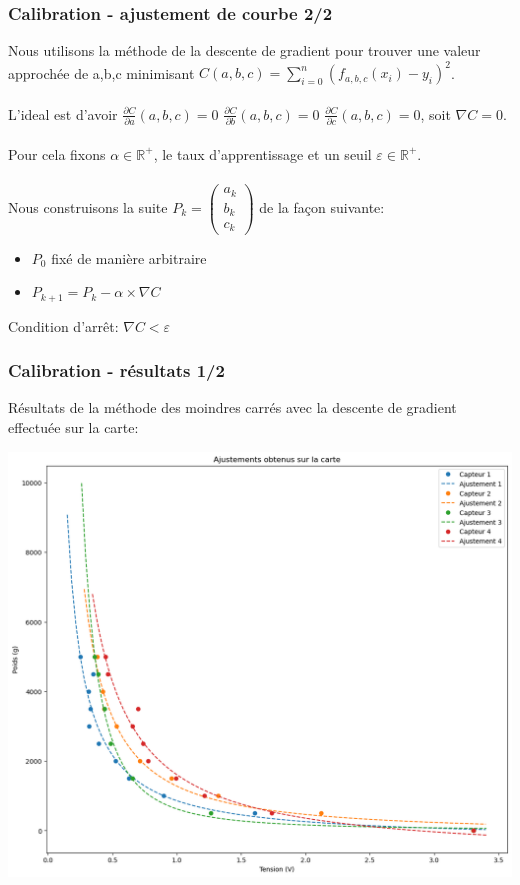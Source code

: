\begin{frame}
    \frametitle{Calibration - ajustement de courbe 2/2}
    Nous utilisons la méthode de la descente de gradient pour trouver une valeur approchée de a,b,c minimisant $C(a,b,c)=\sum_{i=0}^{n} (f_{a,b,c}(x_i)-y_i)^2$.
    \\
    \\
    L'ideal est d'avoir $\frac{\partial C}{\partial a} (a,b,c) = 0$ $\frac{\partial C}{\partial b} (a,b,c) = 0$ $\frac{\partial C}{\partial c} (a,b,c) = 0$, soit $\nabla C = 0$.
    \\
    \\
    Pour cela fixons $\alpha \in \mathbb{R}^+$, le taux d'apprentissage et un seuil $\varepsilon \in \mathbb{R}^+$.
    \\
    \\
    Nous construisons la suite $P_k=\begin{pmatrix} a_k \\ b_k \\ c_k \end{pmatrix}$ de la façon suivante:
    \begin{itemize}
        \item $P_0$ fixé de manière arbitraire
        \item $P_{k+1}= P_{k} - \alpha \times \nabla C$
    \end{itemize}
    Condition d'arrêt: $\nabla C < \varepsilon$
\end{frame}

\begin{frame}
    \frametitle{Calibration - résultats 1/2}
    Résultats de la méthode des moindres carrés avec la descente de gradient effectuée sur la carte:
    \begin{center}
        \includegraphics[scale=0.3]{./figures/cal_01.png}
    \end{center}
\end{frame}

